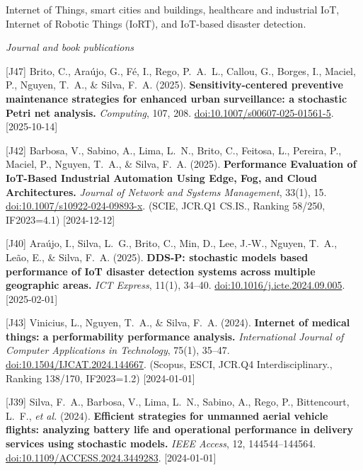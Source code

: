 {\begin{pubenumerate}
\end{pubenumerate}


Internet of Things, smart cities and buildings, healthcare and industrial IoT, Internet of Robotic Things (IoRT), and IoT-based disaster detection.

\textit{Journal and book publications}
\begin{pubenumerate}
\item {\color{blue}[J47]} Brito, C., Ara\'ujo, G., F\'e, I., Rego, P.\ A.\ L., Callou, G., Borges, I., Maciel, P., Nguyen, T.\ A., \& Silva, F.\ A. (2025). 
  \textbf{Sensitivity-centered preventive maintenance strategies for enhanced urban surveillance: a stochastic Petri net analysis.} 
  \textit{Computing}, 107, 208. 
  \href{https://doi.org/10.1007/s00607-025-01561-5}{doi:10.1007/s00607-025-01561-5}. [2025-10-14]

\item {\color{blue}[J42]} Barbosa, V., Sabino, A., Lima, L.\ N., Brito, C., Feitosa, L., Pereira, P., Maciel, P., Nguyen, T.\ A., \& Silva, F.\ A. (2025). 
  \textbf{Performance Evaluation of IoT-Based Industrial Automation Using Edge, Fog, and Cloud Architectures.} 
  \textit{Journal of Network and Systems Management}, 33(1), 15. 
  \href{https://doi.org/10.1007/s10922-024-09893-x}{doi:10.1007/s10922-024-09893-x}. 
  (SCIE, JCR.Q1 CS.IS., Ranking 58/250, IF2023=4.1) [2024-12-12]

\item {\color{blue}[J40]} Ara\'ujo, I., Silva, L.\ G., Brito, C., Min, D., Lee, J.-W., Nguyen, T.\ A., Le\~ao, E., \& Silva, F.\ A. (2025). 
  \textbf{DDS-P: stochastic models based performance of IoT disaster detection systems across multiple geographic areas.} 
  \textit{ICT Express}, 11(1), 34--40. 
  \href{https://doi.org/10.1016/j.icte.2024.09.005}{doi:10.1016/j.icte.2024.09.005}. [2025-02-01]

\item {\color{blue}[J43]} Vinicius, L., Nguyen, T.\ A., \& Silva, F.\ A. (2024). 
  \textbf{Internet of medical things: a performability performance analysis.} 
  \textit{International Journal of Computer Applications in Technology}, 75(1), 35--47. 
  \href{https://doi.org/10.1504/IJCAT.2024.144667}{doi:10.1504/IJCAT.2024.144667}. 
  (Scopus, ESCI, JCR.Q4 Interdisciplinary., Ranking 138/170, IF2023=1.2) [2024-01-01]

\item {\color{blue}[J39]} Silva, F.\ A., Barbosa, V., Lima, L.\ N., Sabino, A., Rego, P., Bittencourt, L.\ F., \textit{et al.} (2024). 
  \textbf{Efficient strategies for unmanned aerial vehicle flights: analyzing battery life and operational performance in delivery services using stochastic models.} 
  \textit{IEEE Access}, 12, 144544--144564. 
  \href{https://doi.org/10.1109/ACCESS.2024.3449283}{doi:10.1109/ACCESS.2024.3449283}. [2024-01-01]


\end{pubenumerate}}
